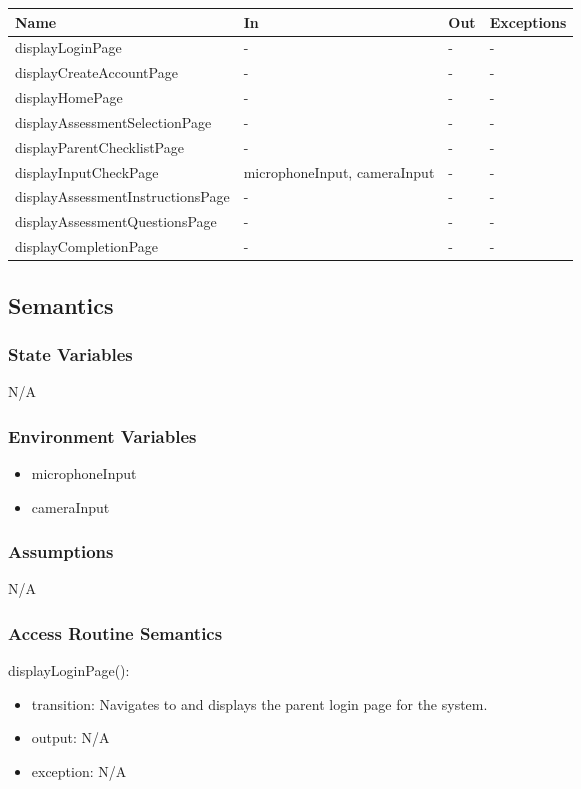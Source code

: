 \documentclass[12pt, titlepage]{article}
\begin{document}
\begin{center}
\begin{tabular}{p{8cm} p{4cm} p{2cm} p{2cm}}
\hline
\textbf{Name} & \textbf{In} & \textbf{Out} & \textbf{Exceptions} \\
\hline
displayLoginPage & - & - & - \\
displayCreateAccountPage & - & - & - \\
displayHomePage & - & - & - \\
displayAssessmentSelectionPage & - & - & - \\
displayParentChecklistPage & - & - & - \\
displayInputCheckPage & microphoneInput, cameraInput & - & - \\
displayAssessmentInstructionsPage & - & - & - \\
displayAssessmentQuestionsPage & - & - & - \\
displayCompletionPage & - & - & - \\
\hline
\end{tabular}
\end{center}

\subsection{Semantics}

\subsubsection{State Variables}
N/A

\subsubsection{Environment Variables}
\begin{itemize}
  \item microphoneInput
  \item cameraInput
\end{itemize}

\subsubsection{Assumptions}
N/A

\subsubsection{Access Routine Semantics}

\noindent displayLoginPage():
\begin{itemize}
\item transition: Navigates to and displays the parent login page for the system.
\item output: N/A
\item exception: N/A
\end{itemize}
\end{document}
